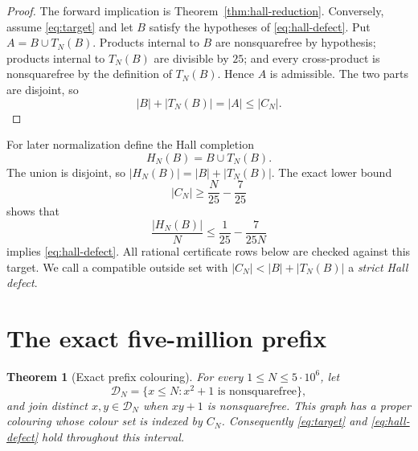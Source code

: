 \documentclass[11pt]{article}
\newtheorem{theorem}{Theorem}[section]
\theoremstyle{definition}
\newcommand{\CN}{C_N}
\newcommand{\TN}{T_N}
\newcommand{\FiveMillion}{5\cdot10^6}
\begin{document}
\begin{proof}
The forward implication is Theorem~\ref{thm:hall-reduction}.  Conversely,
assume \eqref{eq:target} and let $B$ satisfy the hypotheses of
\eqref{eq:hall-defect}.  Put $A=B\cup\TN(B)$.  Products internal to $B$ are
nonsquarefree by hypothesis; products internal to $\TN(B)$ are divisible by
$25$; and every cross-product is nonsquarefree by the definition of
$\TN(B)$.  Hence $A$ is admissible.  The two parts are disjoint, so
\[
 |B|+|\TN(B)|=|A|\leq|\CN|.
\]
\end{proof}

For later normalization define the Hall completion
\[
  H_N(B)=B\cup\TN(B).
\]
The union is disjoint, so $|H_N(B)|=|B|+|\TN(B)|$.  The exact lower bound
\begin{equation}\label{eq:normalized-target}
  |\CN|\geq \frac N{25}-\frac7{25}
\end{equation}
shows that
\[
 \frac{|H_N(B)|}{N}\leq \frac1{25}-\frac7{25N}
\]
implies \eqref{eq:hall-defect}.  All rational certificate rows below are
checked against this target.
We call a compatible outside set with
$|\CN|<|B|+|\TN(B)|$ a \emph{strict Hall defect}.

\section{The exact five-million prefix}

\begin{theorem}[Exact prefix colouring]
\label{thm:finite-prefix-colouring-close}
For every $1\leq N\leq\FiveMillion$, let
\[
 \mathcal D_N=\{x\leq N:x^2+1\text{ is nonsquarefree}\},
\]
and join distinct $x,y\in\mathcal D_N$ when $xy+1$ is nonsquarefree.
This graph has a proper colouring whose colour set is indexed by $\CN$.
Consequently \eqref{eq:target} and \eqref{eq:hall-defect} hold throughout
this interval.
\end{theorem}
\end{document}

